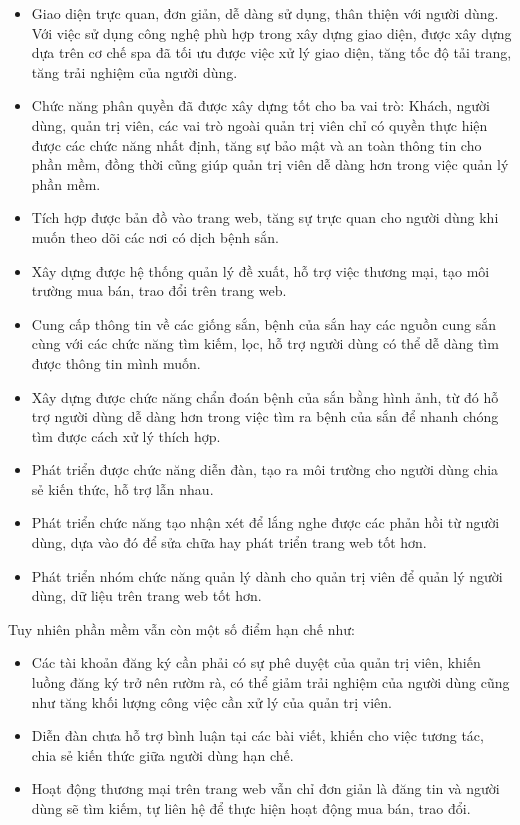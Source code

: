 \documentclass[./../main.tex]{subfiles}
\begin{document}
\begin{itemize}
    \item Giao diện trực quan, đơn giản, dễ dàng sử dụng, thân thiện với người dùng. Với việc sử dụng công nghệ phù hợp trong xây dựng giao diện, được xây dựng dựa trên cơ chế \acrfull{spa}  đã tối ưu được việc xử lý giao diện, tăng tốc độ tải trang, tăng trải nghiệm của người dùng.
    \item Chức năng phân quyền đã được xây dựng tốt cho ba vai trò: Khách, người dùng, quản trị viên, các vai trò ngoài quản trị viên chỉ có quyền thực hiện được các chức năng nhất định, tăng sự bảo mật và an toàn thông tin cho phần mềm, đồng thời cũng giúp quản trị viên dễ dàng hơn trong việc quản lý phần mềm.
    \item Tích hợp được bản đồ vào trang web, tăng sự trực quan cho người dùng khi muốn theo dõi các nơi có dịch bệnh sắn.
    \item Xây dựng được hệ thống quản lý đề xuất, hỗ trợ việc thương mại, tạo môi trường mua bán, trao đổi trên trang web.
    \item Cung cấp thông tin về các giống sắn, bệnh của sắn hay các nguồn cung sắn cùng với các chức năng tìm kiếm, lọc, hỗ trợ người dùng có thể dễ dàng tìm được thông tin mình muốn.
    \item Xây dựng được chức năng chẩn đoán bệnh của sắn bằng hình ảnh, từ đó hỗ trợ người dùng dễ dàng hơn trong việc tìm ra bệnh của sắn để nhanh chóng tìm được cách xử lý thích hợp.
    \item Phát triển được chức năng diễn đàn, tạo ra môi trường cho người dùng chia sẻ kiến thức, hỗ trợ lẫn nhau.
    \item Phát triển chức năng tạo nhận xét để lắng nghe được các phản hồi từ người dùng, dựa vào đó để sửa chữa hay phát triển trang web tốt hơn.
    \item Phát triển nhóm chức năng quản lý dành cho quản trị viên để quản lý người dùng, dữ liệu trên trang web tốt hơn.
\end{itemize}
Tuy nhiên phần mềm vẫn còn một số điểm hạn chế như: 
\begin{itemize}
    \item Các tài khoản đăng ký cần phải có sự phê duyệt của quản trị viên, khiến luồng đăng ký trở nên rườm rà, có thể giảm trải nghiệm của người dùng cũng như tăng khối lượng công việc cần xử lý của quản trị viên.
    \item Diễn đàn chưa hỗ trợ bình luận tại các bài viết, khiến cho việc tương tác, chia sẻ kiến thức giữa người dùng hạn chế.
    \item Hoạt động thương mại trên trang web vẫn chỉ đơn giản là đăng tin và người dùng sẽ tìm kiếm, tự liên hệ để thực hiện hoạt động mua bán, trao đổi.
\end{itemize}
\end{document}
